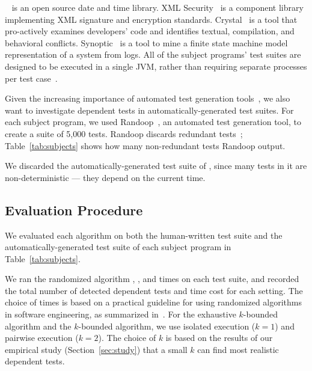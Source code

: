 \jt~\cite{jodatime} is an open source
date and time library.  XML Security~\cite{xmlsecurity}
is a component library implementing XML signature and encryption
standards. 
Crystal~\cite{Brun:2011:PDC, crystal} is a tool that
pro-actively examines developers' code and
identifies textual, compilation, and behavioral conflicts.
Synoptic~\cite{synoptic, Beschastnikh:2011:LEI} is a tool to mine a finite state
machine model representation of a system from logs.
All of the subject programs' test suites are designed to be executed in
a single JVM, rather than requiring separate processes per test case~\cite{vmvm}.

Given the increasing importance of automated test generation
tools~\cite{PachecoLET2007, ZhangSBE2011, Csallner:2004, fraseretal:ISSTA:2011},
we also want to investigate dependent tests in automatically-generated
test suites. For each subject program, we used
Randoop~\cite{PachecoLET2007}, an automated
test generation tool, to create a suite of 5,000 tests.
Randoop discards redundant tests~\cite[\S III.E]{RobinsonEPAL2011};
Table~\ref{tab:subjects} shows how many non-redundant
tests Randoop output.

We discarded the automatically-generated test suite of
\jt, since many tests in it are non-deterministic ---
they depend on the current time.


\tinyrelax %
\subsection{Evaluation Procedure}

We evaluated each algorithm 
on both the human-written test suite 
and the automatically-generated test suite
of each subject program in Table~\ref{tab:subjects}.


We ran the randomized algorithm \smalltrialnum, \mediumtrialnum,
and \trialnum times on each test suite, and recorded
the total number of detected dependent tests and time cost
for each setting. The choice of \trialnum times is based
on a practical guideline for using randomized algorithms
in software engineering, as summarized in~\cite{Arcuri:2011}.
%
For the exhaustive $k$-bounded algorithm
and the \dependenceaware{} $k$-bounded algorithm,
we use isolated execution ($k = 1$) and
pairwise execution ($k = 2$). The choice of $k$ is
based on the results of our empirical
study (Section~\ref{sec:study}) that a small $k$
can find most realistic dependent tests.

